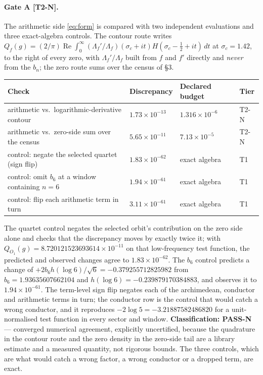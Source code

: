 \documentclass[11pt,a4paper]{article}
\theoremstyle{definition}
\theoremstyle{remark}
\newcommand{\tier}[1]{{\small\textsf{[#1]}}}
\begin{document}
\paragraph{Gate A \tier{T2-N}.} The arithmetic side \eqref{eq:form} is compared with two
independent evaluations and three exact-algebra controls. The contour route writes
$Q_f(g) = (2/\pi)\operatorname{Re}\int_0^\infty(\Lambda_f'/\Lambda_f)(\sigma_c+it)
H(\sigma_c-\tfrac12+it)\,dt$ at $\sigma_c = 1.42$, to the right of every zero, with
$\Lambda_f'/\Lambda_f$ built from $f$ and $f'$ directly and \emph{never} from the $b_n$;
the zero route sums over the census of \S3.

\begin{center}
\begin{tabular}{@{}llll@{}}
\toprule
Check & Discrepancy & Declared budget & Tier \\
\midrule
arithmetic vs.\ logarithmic-derivative contour & $1.73\times10^{-13}$ & $1.316\times10^{-6}$ & T2-N \\
arithmetic vs.\ zero-side sum over the census & $5.65\times10^{-11}$ & $7.13\times10^{-5}$ & T2-N \\
control: negate the selected quartet (sign flip) & $1.83\times10^{-62}$ & exact algebra & T1 \\
control: omit $b_6$ at a window containing $n=6$ & $1.94\times10^{-61}$ & exact algebra & T1 \\
control: flip each arithmetic term in turn & $3.11\times10^{-61}$ & exact algebra & T1 \\
\bottomrule
\end{tabular}
\end{center}

\noindent The quartet control negates the selected orbit's contribution on the zero side
alone and checks that the discrepancy moves by exactly twice it; with
$Q_{O_1}(g) = 8.720121523693614\times10^{-11}$ on that low-frequency test function, the
predicted and observed changes agree to $1.83\times10^{-62}$. The $b_6$ control predicts
a change of $+2b_6h(\log6)/\sqrt6 = -0.379255712825982$ from
$b_6 = 1.93635607662104$ and $h(\log 6) = -0.239879170384883$, and observes it to
$1.94\times10^{-61}$. The term-level sign flip negates each of the archimedean,
conductor and arithmetic terms in turn; the conductor row is the control that would catch
a wrong conductor, and it reproduces $-2\log5 = -3.21887582486820$ for a unit-normalised
test function in every sector and window. \textbf{Classification: PASS-N} --- converged
numerical agreement, explicitly uncertified, because the quadrature in the contour route
and the zero density in the zero-side tail are a library estimate and a measured quantity,
not rigorous bounds. The three controls, which are what would catch a wrong factor, a
wrong conductor or a dropped term, are exact.
\end{document}
